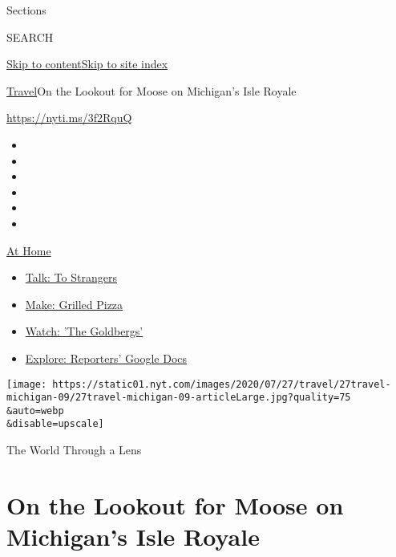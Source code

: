 Sections

SEARCH

\protect\hyperlink{site-content}{Skip to
content}\protect\hyperlink{site-index}{Skip to site index}

\href{/section/travel}{Travel}\textbar{}On the Lookout for Moose on
Michigan's Isle Royale

\url{https://nyti.ms/3f2RquQ}

\begin{itemize}
\item
\item
\item
\item
\item
\item
\end{itemize}

\href{https://www.nytimes.com/spotlight/at-home?action=click\&pgtype=Article\&state=default\&region=TOP_BANNER\&context=at_home_menu}{At
Home}

\begin{itemize}
\tightlist
\item
  \href{https://www.nytimes.com/2020/08/03/well/family/the-benefits-of-talking-to-strangers.html?action=click\&pgtype=Article\&state=default\&region=TOP_BANNER\&context=at_home_menu}{Talk:
  To Strangers}
\item
  \href{https://www.nytimes.com/2020/08/01/at-home/coronavirus-make-pizza-on-a-grill.html?action=click\&pgtype=Article\&state=default\&region=TOP_BANNER\&context=at_home_menu}{Make:
  Grilled Pizza}
\item
  \href{https://www.nytimes.com/2020/07/31/arts/television/goldbergs-abc-stream.html?action=click\&pgtype=Article\&state=default\&region=TOP_BANNER\&context=at_home_menu}{Watch:
  'The Goldbergs'}
\item
  \href{https://www.nytimes.com/interactive/2020/at-home/even-more-reporters-editors-diaries-lists-recommendations.html?action=click\&pgtype=Article\&state=default\&region=TOP_BANNER\&context=at_home_menu}{Explore:
  Reporters' Google Docs}
\end{itemize}

\texttt{[image: https://static01.nyt.com/images/2020/07/27/travel/27travel-michigan-09/27travel-michigan-09-articleLarge.jpg?quality=75\\\&auto=webp\\\&disable=upscale]}

The World Through a Lens

\hypertarget{on-the-lookout-for-moose-on-michigans-isle-royale}{%
\section{On the Lookout for Moose on Michigan's Isle
Royale}\label{on-the-lookout-for-moose-on-michigans-isle-royale}}

